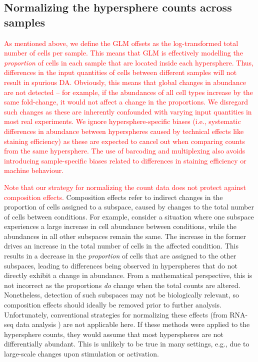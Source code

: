 \documentclass{article}
\newcommand\revised[1]{\textcolor{red}{#1}}
\begin{document}
\subsection{Normalizing the hypersphere counts across samples}
\revised{As mentioned above, we define the GLM offsets as the log-transformed total number of cells per sample.
This means that GLM is effectively modelling the \textit{proportion} of cells in each sample that are located inside each hypersphere.
Thus, differences in the input quantities of cells between different samples will not result in spurious DA.
Obviously, this means that global changes in abundance are not detected -- for example, if the abundances of all cell types increase by the same fold-change, it would not affect a change in the proportions.
We disregard such changes as these are inherently confounded with varying input quantities in most real experiments.
We ignore hypersphere-specific biases (i.e., systematic differences in abundance between hyperspheres caused by technical effects like staining efficiency) as these are expected to cancel out when comparing counts from the same hypersphere.
The use of barcoding and multiplexing also avoids introducing sample-specific biases related to differences in staining efficiency or machine behaviour.}


\revised{Note that our strategy for normalizing the count data does not protect against composition effects.}
Composition effects refer to indirect changes in the proportion of cells assigned to a subspace, caused by changes to the total number of cells between conditions.
For example, consider a situation where one subspace experiences a large increase in cell abundance between conditions, while the abundances in all other subspaces remain the same.
The increase in the former drives an increase in the total number of cells in the affected condition.
This results in a decrease in the \textit{proportion} of cells that are assigned to the other subspaces, leading to differences being observed in hyperspheres that do not directly exhibit a change in abundance.
From a mathematical perspective, this is not incorrect as the proportions \textit{do} change when the total counts are altered.
Nonetheless, detection of such subspaces may not be biologically relevant, so composition effects should ideally be removed prior to further analysis.
Unfortunately, conventional strategies for normalizing these effects (from RNA-seq data analysis \cite{robinson2010scaling}) are not applicable here.
If these methods were applied to the hypersphere counts, they would assume that most hyperspheres are not differentially abundant.
This is unlikely to be true in many settings, e.g., due to large-scale changes upon stimulation or activation.
\end{document}
